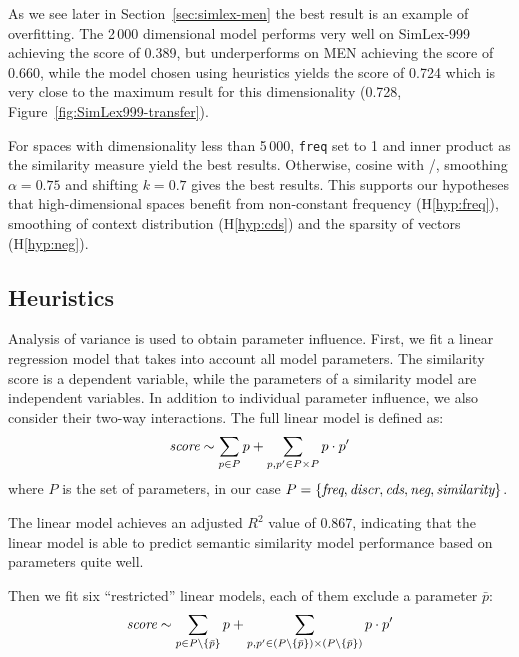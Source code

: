 

As we see later in Section~\ref{sec:simlex-men} the best result is an example of overfitting. The 2\,000 dimensional model performs very well on SimLex-999 achieving the score of 0.389, but underperforms on MEN achieving the score of 0.660, while the model chosen using heuristics yields the score of 0.724 which is very close to the maximum result for this dimensionality (0.728, Figure~\ref{fig:SimLex999-transfer}).

For spaces with dimensionality less than 5\,000, \texttt{freq} set to 1 and inner product as the similarity measure yield the best results. Otherwise, cosine with \logNSCPMI/, smoothing $\alpha=0.75$ and shifting $k=0.7$ gives the best results. This supports our hypotheses that high-dimensional spaces benefit from non-constant frequency (H\ref{hyp:freq}), smoothing of context distribution (H\ref{hyp:cds}) and the sparsity of vectors (H\ref{hyp:neg}).

\subsection{Heuristics}
\label{sec:heuristics-simlex}

% 

Analysis of variance is used to obtain parameter influence. First, we fit a linear regression model that takes into account all model parameters. The similarity score is a dependent variable, while the parameters of a similarity model are independent variables. In addition to individual parameter influence, we also consider their two-way interactions. The full linear model is defined as:
\begin{equation}
  \text{\it score} \sim \sum_{p \in P}p + \sum_{p, p' \in P \times P}p \cdot p'
\end{equation}
where $P$ is the set of parameters, in our case $P = \{\text{\it freq}, \text{\it discr}, \text{\it cds}, \text{\it neg}, \text{\it similarity} \}$.

The linear model achieves an adjusted $R^2$ value of 0.867, indicating that the linear model is able to predict semantic similarity model performance based on parameters quite well.

Then we fit six ``restricted'' linear models, each of them exclude a parameter $\bar p$:
\begin{equation}
  \text{\it score} \sim \sum_{p \in P \setminus \{\bar p\} }p + \sum_{p, p' \in (P \setminus \{\bar p\}) \times (P \setminus \{\bar p\})}p \cdot p'
\end{equation}


